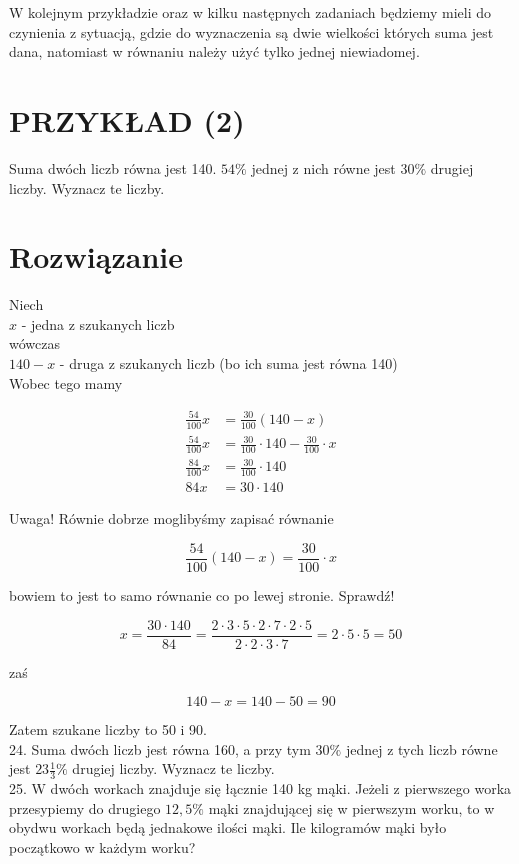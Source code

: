 \documentclass[10pt]{article}
\begin{document}
W kolejnym przykładzie oraz w kilku następnych zadaniach będziemy mieli do czynienia z sytuacją, gdzie do wyznaczenia są dwie wielkości których suma jest dana, natomiast w równaniu należy użyć tylko jednej niewiadomej.

\section*{PRZYKŁAD (2)}
Suma dwóch liczb równa jest 140. \(54 \%\) jednej z nich równe jest \(30 \%\) drugiej liczby. Wyznacz te liczby.

\section*{Rozwiązanie}
Niech\\
\(x\) - jedna z szukanych liczb\\
wówczas\\
\(140-x\) - druga z szukanych liczb (bo ich suma jest równa 140)\\
Wobec tego mamy

\[
\begin{aligned}
\frac{54}{100} x & =\frac{30}{100}(140-x) \\
\frac{54}{100} x & =\frac{30}{100} \cdot 140-\frac{30}{100} \cdot x \\
\frac{84}{100} x & =\frac{30}{100} \cdot 140 \\
84 x & =30 \cdot 140
\end{aligned}
\]

Uwaga! Równie dobrze moglibyśmy zapisać równanie

\[
\frac{54}{100}(140-x)=\frac{30}{100} \cdot x
\]

bowiem to jest to samo równanie co po lewej stronie. Sprawdź!

\[
x=\frac{30 \cdot 140}{84}=\frac{2 \cdot 3 \cdot 5 \cdot 2 \cdot 7 \cdot 2 \cdot 5}{2 \cdot 2 \cdot 3 \cdot 7}=2 \cdot 5 \cdot 5=50
\]

zaś

\[
140-x=140-50=90
\]

Zatem szukane liczby to 50 i 90.\\
24. Suma dwóch liczb jest równa 160, a przy tym \(30 \%\) jednej z tych liczb równe jest \(23 \frac{1}{3} \%\) drugiej liczby. Wyznacz te liczby.\\
25. W dwóch workach znajduje się łącznie 140 kg mąki. Jeżeli z pierwszego worka przesypiemy do drugiego \(12,5 \%\) mąki znajdującej się w pierwszym worku, to w obydwu workach będą jednakowe ilości mąki. Ile kilogramów mąki było początkowo w każdym worku?
\end{document}
